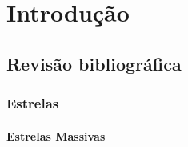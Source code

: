 \part{Introdução}
\chapter{Revisão bibliográfica}
\section{Estrelas}
\subsection{Estrelas Massivas}
  
